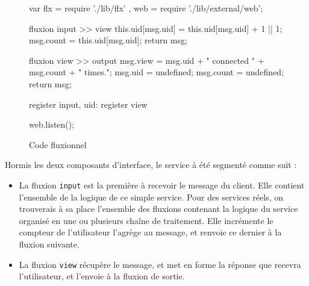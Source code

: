 \begin{figure}
  \begin{code}
  var flx = require './lib/flx'
    , web = require './lib/external/web';

  fluxion input >> view
    this.uid[msg.uid] = this.uid[msg.uid] + 1 || 1;
    msg.count = this.uid[msg.uid];
    return msg;

  fluxion view >> output
    msg.view = msg.uid + " connected " + msg.count + " times.";
    msg.uid = undefined;
    msg.count = undefined;
    return msg;

  register input, {uid: {}}
  register view

  web.listen();
  \end{code}
  \caption{Code fluxionnel}
  \label{lst:fluxionnel}
\end{figure}

Hormis les deux composants d'interface, le service à été segmenté comme suit :
\begin{itemize}
  \item La fluxion \texttt{input} est la première à recevoir le message du client.
  Elle contient l'ensemble de la logique de ce simple service.
  Pour des services réels, on trouverais à sa place l'ensemble des fluxions contenant la logique du service organisé en une ou plusieurs chaîne de traitement.
  Elle incrémente le compteur de l'utilisateur l'agrège au message, et renvoie ce dernier à la fluxion suivante.
  \item La fluxion \texttt{view} récupère le message, et met en forme la réponse que recevra l'utilisateur, et l'envoie à la fluxion de sortie.
\end{itemize}




